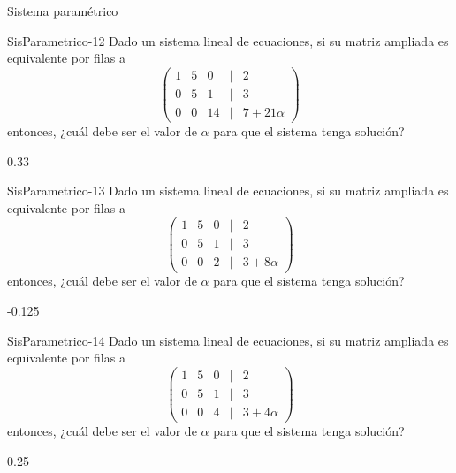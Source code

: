 \documentclass[a4,11pt]{aleph-notas}
\begin{document}
\begin{quiz}{Sistema paramétrico}
\begin{numerical}[tolerance=0.01]%
    {SisParametrico-12}
    Dado un sistema lineal de ecuaciones, si su matriz ampliada es equivalente por filas a 
    \[
    \begin{pmatrix}
    1 & 5 & 0 & | & 2 \\
    0 & 5 & 1 & | & 3 \\
    0 & 0 & 14 & | & 7+21\alpha
    \end{pmatrix}
    \]
    entonces, ¿cuál debe ser el valor de $\alpha$ para que el sistema tenga solución?
    \item 0.33
\end{numerical}

\begin{numerical}[tolerance=0.01]%
    {SisParametrico-13}
    Dado un sistema lineal de ecuaciones, si su matriz ampliada es equivalente por filas a 
    \[
    \begin{pmatrix}
    1 & 5 & 0 & | & 2 \\
    0 & 5 & 1 & | & 3 \\
    0 & 0 & 2 & | & 3+8\alpha
    \end{pmatrix}
    \]
    entonces, ¿cuál debe ser el valor de $\alpha$ para que el sistema tenga solución?
    \item -0.125
\end{numerical}

\begin{numerical}[tolerance=0.01]%
    {SisParametrico-14}
    Dado un sistema lineal de ecuaciones, si su matriz ampliada es equivalente por filas a 
    \[ 
    \begin{pmatrix}
    1 & 5 & 0 & | & 2 \\
    0 & 5 & 1 & | & 3 \\
    0 & 0 & 4 & | & 3+4\alpha
    \end{pmatrix}
    \]
    entonces, ¿cuál debe ser el valor de $\alpha$ para que el sistema tenga solución?
    \item 0.25
\end{numerical}
\end{quiz}
\end{document}
